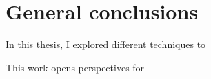 
\chapter*{General conclusions}

In this thesis, I explored different techniques to 

\begin{center}
\end{center}

This work opens perspectives for 

\vfill
\begin{center}
\end{center}
\vfill\vfill
